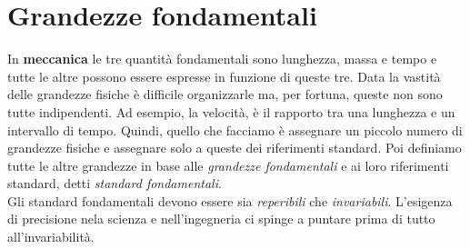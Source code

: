 \documentclass[12pt]{report}
\begin{document}
	\section{Grandezze fondamentali}
	In \textbf{meccanica} le tre quantità fondamentali sono lunghezza, massa e tempo e tutte le altre possono essere espresse in funzione di queste tre.
	Data la vastità delle grandezze fisiche è  difficile organizzarle ma, per fortuna, queste non sono tutte indipendenti. Ad esempio, la velocità, è  il rapporto tra una lunghezza e un intervallo di tempo. Quindi, quello che facciamo è  assegnare un piccolo numero di grandezze fisiche e assegnare solo a queste dei riferimenti standard. Poi definiamo tutte le altre grandezze in base alle \textit{grandezze fondamentali} e ai loro riferimenti standard, detti \textit{standard fondamentali}. \\
	Gli standard fondamentali devono essere sia \textit{reperibili} che \textit{invariabili}. L'esigenza di precisione nela scienza e nell'ingegneria ci spinge a puntare prima di tutto all'invariabilità.
\end{document}
